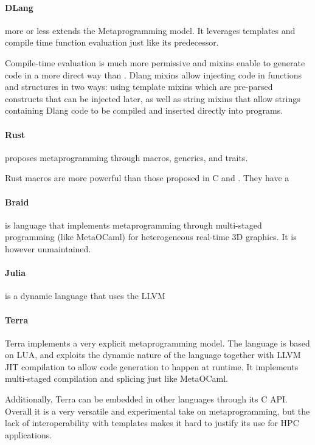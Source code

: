 \documentclass[../main]{subfiles}
\begin{document}
\paragraph{DLang} more or less extends the \cpp Metaprogramming model.
It leverages templates and compile time function evaluation just like
its predecessor.

Compile-time evaluation is much more permissive and mixins enable to generate
code in a more direct way than \cpp. Dlang mixins allow injecting code in
functions and structures in two ways: using template mixins
which are pre-parsed constructs that can be injected later,
as well as string mixins that allow strings containing Dlang code
to be compiled and inserted directly into programs.

\paragraph{Rust} proposes metaprogramming through macros, generics, and traits.

Rust macros are more powerful than those proposed in C and \cpp.
They have a

\paragraph{Braid} \cite{braid} is language that implements metaprogramming
through multi-staged programming (like MetaOCaml) for heterogeneous real-time
3D graphics. It is however unmaintained.

\paragraph{Julia} \cite{julia} is a dynamic language that uses the LLVM

\paragraph{Terra}

Terra\cite{terra} implements a very explicit metaprogramming model.
The language is based on LUA, and exploits the dynamic nature of the language
together with LLVM JIT compilation to allow code generation
to happen at runtime.
It implements multi-staged compilation and splicing just like MetaOCaml.

Additionally, Terra can be embedded in other languages through its C API.
Overall it is a very versatile and experimental take on metaprogramming,
but the lack of interoperability with \cpp templates makes it hard to justify
its use for HPC applications.
\end{document}
